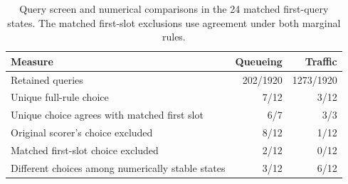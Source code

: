 \begin{table}[htbp]\centering
\caption{Query screen and numerical comparisons in the 24 matched first-query states.
The matched first-slot exclusions use agreement under both marginal rules.}
\label{tab:query_screen}
\small\begin{tabular}{lrr}\toprule
Measure & Queueing & Traffic \\
\midrule
Retained queries & 202/1920 & 1273/1920 \\
Unique full-rule choice & 7/12 & 3/12 \\
Unique choice agrees with matched first slot & 6/7 & 3/3 \\
Original scorer's choice excluded & 8/12 & 1/12 \\
Matched first-slot choice excluded & 2/12 & 0/12 \\
Different choices among numerically stable states & 3/12 & 6/12 \\
\bottomrule\end{tabular}
\end{table}
